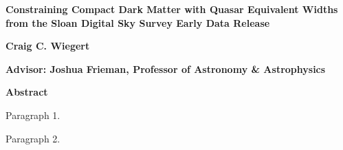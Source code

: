 \documentclass[12pt]{report}
\begin{document}
\doublespacing

\begin{list}{}{\setlength{\leftmargin}{2em}
\setlength{\labelwidth}{0em} \setlength{\labelsep}{0em}
\setlength{\itemindent}{-2em}
}
\item \textbf{Constraining Compact Dark Matter with Quasar Equivalent
    Widths from the Sloan Digital Sky Survey Early Data Release}
\item \textbf{Craig C. Wiegert}
\item \textbf{\bf Advisor: Joshua Frieman, Professor of Astronomy \&
    Astrophysics}
\end{list}

\begin{center}
\textbf{\Large Abstract}
\end{center}

Paragraph 1.

Paragraph 2.
\end{document}
